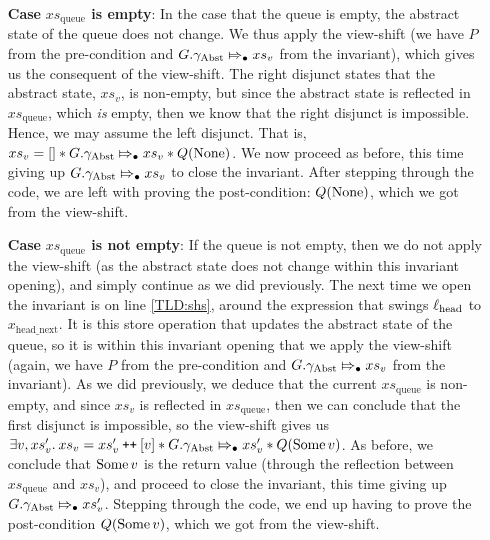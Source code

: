\documentclass[a4paper, 10pt]{report}
\theoremstyle{definition}
\newcommand{\xsqueue}{xs_{\mathrm{queue}}}
\newcommand{\locN}[1]{\loc_{\mathrm{#1}}}
\newcommand{\lochead}{\locN{head}}
\newcommand{\node}{x}
\newcommand{\nodeN}[1]{\node_{\mathrm{#1}}}
\newcommand{\nodeheadnext}{\nodeN{head\_next}}
\newcommand{\absvalue}{\val}
\newcommand{\absvalueList}{xs_v}
\newcommand{\Qg}{G}
\newcommand{\gabst}{\gname_{\mathrm{Abst}}}
\newcommand\catenate{\mathbin{\text{\ttfamily\upshape ++}}}
\newcommand{\abstractstateauth}[2]{#1 \Mapsto_{\bullet} #2}
\begin{document}
\begin{itemize}
  \item[\textbf{Case}] \textbf{$\xsqueue$ is empty}:
  In the case that the queue is empty, the abstract state of the queue does not change. We thus apply the view-shift (we have $P$ from the pre-condition and $\abstractstateauth{\Qg.\gabst}{\absvalueList}$ from the invariant), which gives us the consequent of the view-shift. The right disjunct states that the abstract state, $\absvalueList$, is non-empty, but since the abstract state is reflected in $\xsqueue$, which \emph{is} empty, then we know that the right disjunct is impossible. Hence, we may assume the left disjunct. That is, $\absvalueList = [] \star{} \abstractstateauth{\Qg.\gabst}{\absvalueList} \star{} Q(\None)$. We now proceed as before, this time giving up $\abstractstateauth{\Qg.\gabst}{\absvalueList}$ to close the invariant. After stepping through the code, we are left with proving the post-condition: $Q(\operatorname{None})$, which we got from the view-shift.

  \item[\textbf{Case}] \textbf{$\xsqueue$ is not empty}:
  If the queue is not empty, then we do not apply the view-shift (as the abstract state does not change within this invariant opening), and simply continue as we did previously. The next time we open the invariant is on line \ref{TLD:shs}, around the expression that swings $\lochead$ to $\nodeheadnext$. It is this store operation that updates the abstract state of the queue, so it is within this invariant opening that we apply the view-shift (again, we have $P$ from the pre-condition and $\abstractstateauth{\Qg.\gabst}{\absvalueList}$ from the invariant). As we did previously, we deduce that the current $\xsqueue$ is non-empty, and since $\absvalueList$ is reflected in $\xsqueue$, then we can conclude that the first disjunct is impossible, so the view-shift gives us $\Exists \absvalue, \absvalueList' . \absvalueList = \absvalueList' \catenate [\absvalue] \star{} \abstractstateauth{\Qg.\gabst}{\absvalueList'} \star{} Q(\Some{\absvalue})$. As before, we conclude that $\Some{\absvalue}$ is the return value (through the reflection between $\xsqueue$ and $\absvalueList$), and proceed to close the invariant, this time giving up $\abstractstateauth{\Qg.\gabst}{\absvalueList'}$. Stepping through the code, we end up having to prove the post-condition $Q(\Some{\absvalue})$, which we got from the view-shift.
\end{itemize}

\end{document}

